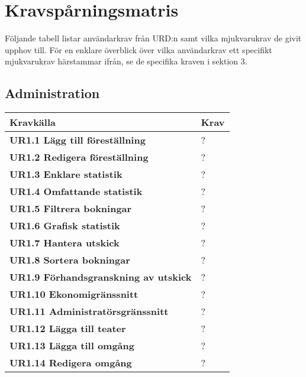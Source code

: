 \documentclass[a4paper, twoside, 11pt, titlepage]{article}
\begin{document}
\clearpage
\section{Kravspårningsmatris}


Följande tabell listar användarkrav från URD:n samt vilka mjukvarukrav de givit upphov till. För en enklare överblick över vilka användarkrav ett specifikt mjukvarukrav härstammar ifrån, se de specifika kraven i sektion 3.


	\subsection{Administration}


	\begin {table} [ht] \begin{tabular} {  p{5.5cm} p{9.6cm} }
		\hline
		\sffamily\textbf{Kravkälla} & \sffamily\textbf{Krav } \\
		\hline
		\sffamily\textbf{UR1.1 Lägg till föreställning} & ?  \\
		\hline
		\sffamily\textbf{UR1.2 Redigera föreställning} & ?  \\
		\hline
		\sffamily\textbf{UR1.3 Enklare statistik} & ?  \\
		\hline
		\sffamily\textbf{UR1.4 Omfattande statistik} & ?  \\
		\hline
		\sffamily\textbf{UR1.5 Filtrera bokningar} & ?  \\
		\hline
		\sffamily\textbf{UR1.6 Grafisk statistik} & ?  \\
		\hline
		\sffamily\textbf{UR1.7 Hantera utskick} & ?  \\
		\hline
		\sffamily\textbf{UR1.8 Sortera bokningar} & ?  \\
		\hline
		\sffamily\textbf{UR1.9 Förhandsgranskning av utskick} & ?  \\
		\hline
		\sffamily\textbf{UR1.10 Ekonomigränssnitt} & ?  \\
		\hline
		\sffamily\textbf{UR1.11 Administratörsgränssnitt} & ?  \\
		\hline
		\sffamily\textbf{UR1.12 Lägga till teater} & ?  \\
		\hline
		\sffamily\textbf{UR1.13 Lägga till omgång} & ?  \\
		\hline
		\sffamily\textbf{UR1.14 Redigera omgång} & ?  \\
		\hline
	\end{tabular} \end{table} \FloatBarrier
\end{document}
